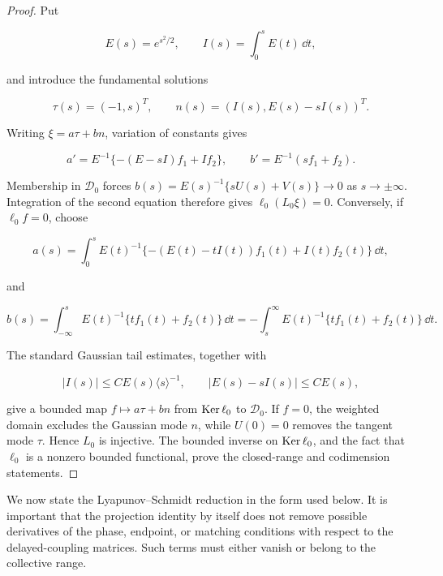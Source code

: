 \begin{proof}
Put

\[
 E(s)=e^{s^2/2},\qquad I(s)=\int_0^sE(t)\,\dd t,
\]

and introduce the fundamental solutions

\[
 \tau(s)=(-1,s)^T,
 \qquad
 n(s)=(I(s),E(s)-sI(s))^T.
\]

Writing \(\xi=a\tau+bn\), variation of constants gives

\begin{equation}
 a'=E^{-1}\{-(E-sI)f_1+If_2\},
 \qquad
 b'=E^{-1}(sf_1+f_2).
 \label{eq:fredholm-fold-variation}
\end{equation}

Membership in \(\mathcal D_0\) forces
\(b(s)=E(s)^{-1}\{sU(s)+V(s)\}\to0\) as \(s\to\pm\infty\).
Integration of the second equation therefore gives
\(\ell_0(L_0\xi)=0\).  Conversely, if \(\ell_0f=0\), choose

\[
 a(s)=\int_0^sE(t)^{-1}
       \{-(E(t)-tI(t))f_1(t)+I(t)f_2(t)\}\,\dd t,
\]

and

\[
 b(s)=\int_{-\infty}^sE(t)^{-1}
       \{tf_1(t)+f_2(t)\}\,\dd t
     =-\int_s^\infty E(t)^{-1}
       \{tf_1(t)+f_2(t)\}\,\dd t.
\]

The standard Gaussian tail estimates, together with

\[
 |I(s)|\le CE(s)\langle s\rangle^{-1},
 \qquad
 |E(s)-sI(s)|\le CE(s),
\]

give a bounded map \(f\mapsto a\tau+bn\) from
\(\operatorname{Ker}\ell_0\) to \(\mathcal D_0\).  If \(f=0\), the weighted domain
excludes the Gaussian mode \(n\), while \(U(0)=0\) removes the tangent mode
\(\tau\).  Hence \(L_0\) is injective.  The bounded inverse on
\(\operatorname{Ker}\ell_0\), and the fact that \(\ell_0\) is a nonzero bounded
functional, prove the closed-range and codimension statements.
\end{proof}

We now state the Lyapunov--Schmidt reduction in the form used below.  It is
important that the projection identity by itself does not remove possible
derivatives of the phase, endpoint, or matching conditions with respect to
the delayed-coupling matrices.  Such terms
must either vanish or belong to the collective range.

